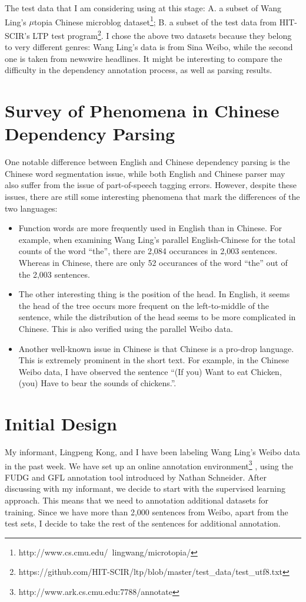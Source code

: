 \documentclass[11pt,letterpaper]{article}
\begin{document}
The test data that I am considering using at this stage: A. a subset of Wang Ling's $\mu$topia Chinese microblog dataset\footnote{http://www.cs.cmu.edu/~lingwang/microtopia/}; B. a subset of the test data from HIT-SCIR's LTP test program\footnote{https://github.com/HIT-SCIR/ltp/blob/master/test\_data/test\_utf8.txt}.
I chose the above two datasets because they belong to very different genres:
Wang Ling's data is from Sina Weibo, while the second one is taken from newswire headlines.
It might be interesting to compare the difficulty in the dependency annotation process,
as well as parsing results.

\section{Survey of Phenomena in Chinese Dependency Parsing}
One notable difference between English and Chinese dependency parsing is the Chinese word segmentation issue,
while both English and Chinese parser may also suffer from the issue of part-of-speech tagging errors.
However, despite these issues, there are still some interesting phenomena that mark the differences of the two languages:
\begin{itemize}
\item Function words are more frequently used in English than in Chinese.
For example, when examining Wang Ling's parallel English-Chinese for the total counts of the word ``the'',
there are 2,084 occurances in 2,003 sentences. Whereas in Chinese, there are only 52 occurances of the word 	``the'' 
out of the 2,003 sentences.
\item The other interesting thing is the position of the head. In English, it seems the head of the tree occurs more frequent
on the left-to-middle of the sentence, while the distribution of the head seems to be more complicated in Chinese.
This is also verified using the parallel Weibo data.
\item Another well-known issue in Chinese is that Chinese is a pro-drop language. 
This is extremely prominent in the short text. For example, in the Chinese Weibo data,
I have observed the sentence ``(If you) Want to eat Chicken, (you) Have to  bear the sounds of chickens.''.
\end{itemize}

\section{Initial Design}
My informant, Lingpeng Kong, and I have been labeling Wang Ling's Weibo data in the past week.
We have set up an online annotation environment\footnote{http://www.ark.cs.cmu.edu:7788/annotate} ,
using the FUDG and GFL annotation tool introduced by Nathan Schneider.
After discussing with my informant, we decide to start with the supervised learning approach.
This means that we need to annotation additional datasets for training.
Since we have more than 2,000 sentences from Weibo, apart from the test sets, 
I decide to take the rest of the sentences for additional annotation.
\end{document}
